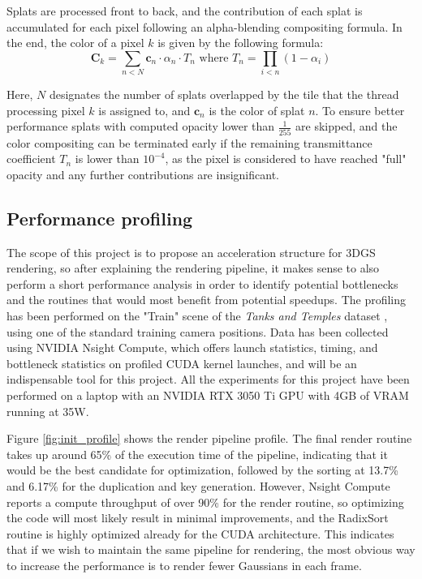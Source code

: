 Splats are processed front to back, and the contribution of each splat is accumulated for each pixel following an alpha-blending compositing formula. In the end, the color of a pixel $k$ is given by the following formula:
\[
\bm{C}_k = \sum_{n < N} \bm{c}_n \cdot \alpha_n \cdot T_n \text{ where } T_n = \prod_{i < n} (1 - \alpha_i)
\]

Here, $N$ designates the number of splats overlapped by the tile that the thread processing pixel $k$ is assigned to, and $\bm{c}_n$ is the color of splat $n$. To ensure better performance splats with computed opacity lower than $\frac{1}{255}$ are skipped, and the color compositing can be terminated early if the remaining transmittance coefficient $T_n$ is lower than $10^{-4}$, as the pixel is considered to have reached "full" opacity and any further contributions are insignificant.

\subsection{Performance profiling}
The scope of this project is to propose an acceleration structure for 3DGS rendering, so after explaining the rendering pipeline, it makes sense to also perform a short performance analysis in order to identify potential bottlenecks and the routines that would most benefit from potential speedups. The profiling has been performed on the "Train" scene of the \textit{Tanks and Temples} dataset \cite{Knapitsch2017}, using one of the standard training camera positions. Data has been collected using NVIDIA Nsight Compute, which offers launch statistics, timing, and bottleneck statistics on profiled CUDA kernel launches, and will be an indispensable tool for this project. All the experiments for this project have been performed on a laptop with an NVIDIA RTX 3050 Ti GPU with 4GB of VRAM running at 35W.

Figure \ref{fig:init_profile} shows the render pipeline profile. The final render routine takes up around 65\% of the execution time of the pipeline, indicating that it would be the best candidate for optimization, followed by the sorting at 13.7\% and 6.17\% for the duplication and key generation. However, Nsight Compute reports a compute throughput of over 90\% for the render routine, so optimizing the code will most likely result in minimal improvements, and the RadixSort routine is highly optimized already for the CUDA architecture. This indicates that if we wish to maintain the same pipeline for rendering, the most obvious way to increase the performance is to render fewer Gaussians in each frame. 

